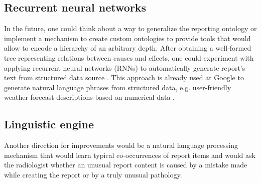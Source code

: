 \documentclass[12pt, twoside, openany]{report}
\theoremstyle{definition}
\begin{document}
\subsection{Recurrent neural networks}
In the future, one could think about a way to generalize the reporting ontology or implement a mechanism to create custom ontologies to provide tools that would allow to encode a hierarchy of an arbitrary depth. After obtaining a well-formed tree representing relations between causes and effects, one could experiment with applying recurrent neural networks (RNNs) to automatically generate report's text from structured data source \cite{recurrent-neural-networks}. This approach is already used at Google  to generate natural language phrases from structured data, e.g. user-friendly weather forecast descriptions based on numerical data \cite{recurrent-neural-networks-google}.
\subsection{Linguistic engine}
Another direction for improvements would be a natural language processing mechanism that would learn typical co-occurrences of report items and would ask the radiologist whether an unusual report content is caused by a mistake made while creating the report or by a truly unusual pathology. 


\end{document}
